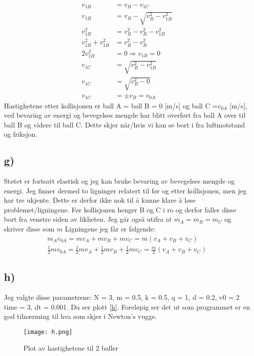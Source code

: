 \documentclass[a4paper,12pt,norsk]{article}
\begin{document}
\begin{align*}
v_{1B} &= v_B - v_{1C} \\
v_{1B} &= v_{B} - \sqrt{v_{B}^2 -v_{1B}^2}\\
v_{1B}^2 &= v_{B}^2 - v_{B}^2 -v_{1B}^2\\
v_{1B}^2+v_{1B}^2 &= v_{B}^2 - v_{B}^2\\
2v_{1B}^2 &= 0 \Rightarrow v_{1B} = 0\\
v_{1C} &= \sqrt{v_{B}^2 -v_{1B}^2}\\
v_{1C} &= \sqrt{v_{B}^2 - 0}\\
v_{1C} &= \pm v_{B} = v_{0A}
\end{align*}
Hastighetene etter kollisjonen er ball A = ball B = 0 [m/s] og ball C =$v_{0A}$ [m/s], ved bevaring av energi og bevegelses mengde har blitt overført fra ball A over til ball B og videre til ball C. Dette skjer når/hvis vi kan se bort i fra luftmotstand og friksjon. 

\subsection*{g)}
Støtet er fortsatt elastisk og jeg kan bruke bevaring av bevegelses mengde og energi. Jeg finner dermed to ligninger relatert til før og etter kollisjonen, men jeg har tre ukjente. Dette er derfor ikke nok til å kunne klare å løse problemet/ligningene. Før kollisjonen henger B og C i ro og derfor faller disse bort fra venstre siden av likheten. Jeg går også utifra at $m_A = m_B = m_C$ og skriver disse som $m$ Ligningene jeg får er følgende:
\begin{align*}
m_Av_{0A} = mv_A + mv_B + mv_C = m(v_A+v_B+v_C)\\
\frac{1}{2}mv_{0A} = \frac{1}{2}mv_A + \frac{1}{2}mv_B + \frac{1}{2}mv_C = \frac{m}{2}(v_A+v_B+v_C)
\end{align*}

\subsection*{h)}
Jeg valgte disse parametrene: N = 3, m = 0.5, k = 0.5, q = 1, d = 0.2, v0 = 2 time = 3, dt = 0.001. Du ser plott \vref{h}. Foreløpig ser det ut som programmet er en god tilnærming til hva som skjer i Newton's vugge.
\begin{figure}[h!]
\texttt{[image: h.png]} 
\caption{Plot av hastighetene til 2 baller}
\label{h}
\end{figure}
\end{document}
